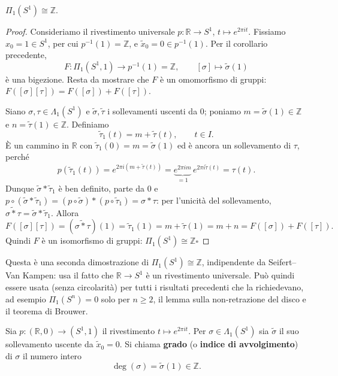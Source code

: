 \begin{teo}
$\Pi_1(S^1) \cong \mathbb{Z}$.
\end{teo}
\begin{proof}
Consideriamo il rivestimento universale $p: \mathbb{R} \to S^1$, $t \mapsto e^{2\pi i t}$. Fissiamo $x_0 = 1 \in S^1$, per cui $p^{-1}(1) = \mathbb{Z}$, e $\widetilde{x}_0 = 0 \in p^{-1}(1)$. Per il corollario precedente,
\[
F: \Pi_1(S^1, 1) \to p^{-1}(1) = \mathbb{Z}, \qquad [\sigma] \mapsto \widetilde{\sigma}(1)
\]
\`e una bigezione. Resta da mostrare che $F$ \`e un omomorfismo di gruppi: $F([\sigma][\tau]) = F([\sigma]) + F([\tau])$.

Siano $\sigma, \tau \in \Lambda_1(S^1)$ e $\widetilde{\sigma}, \widetilde{\tau}$ i sollevamenti uscenti da $0$; poniamo $m = \widetilde{\sigma}(1) \in \mathbb{Z}$ e $n = \widetilde{\tau}(1) \in \mathbb{Z}$. Definiamo
\[
\widetilde{\tau}_1(t) = m + \widetilde{\tau}(t), \qquad t \in I .
\]
\`E un cammino in $\mathbb{R}$ con $\widetilde{\tau}_1(0) = m = \widetilde{\sigma}(1)$ ed \`e ancora un sollevamento di $\tau$, perch\'e
\[
p(\widetilde{\tau}_1(t)) = e^{2\pi i (m + \widetilde{\tau}(t))} = \underbrace{e^{2\pi i m}}_{=1}\, e^{2\pi i \widetilde{\tau}(t)} = \tau(t).
\]
Dunque $\widetilde{\sigma} * \widetilde{\tau}_1$ \`e ben definito, parte da $0$ e $p \circ (\widetilde{\sigma} * \widetilde{\tau}_1) = (p \circ \widetilde{\sigma}) * (p \circ \widetilde{\tau}_1) = \sigma * \tau$: per l'unicit\`a del sollevamento, $\widetilde{\sigma * \tau} = \widetilde{\sigma} * \widetilde{\tau}_1$. Allora
\[
F([\sigma][\tau]) = (\widetilde{\sigma * \tau})(1) = \widetilde{\tau}_1(1) = m + \widetilde{\tau}(1) = m + n = F([\sigma]) + F([\tau]).
\]
Quindi $F$ \`e un isomorfismo di gruppi: $\Pi_1(S^1) \cong \mathbb{Z}$\hfill$\square$
\end{proof}

\begin{observacion}
Questa \`e una seconda dimostrazione di $\Pi_1(S^1) \cong \mathbb{Z}$, indipendente da Seifert--Van Kampen: usa il fatto che $\mathbb{R} \to S^1$ \`e un rivestimento universale. Pu\`o quindi essere usata (senza circolarit\`a) per tutti i risultati precedenti che la richiedevano, ad esempio $\Pi_1(S^n)=0$ solo per $n \geqslant 2$, il lemma sulla non-retrazione del disco e il teorema di Brouwer.
\end{observacion}

\begin{definicion}
Sia $p: (\mathbb{R}, 0) \to (S^1, 1)$ il rivestimento $t \mapsto e^{2\pi i t}$. Per $\sigma \in \Lambda_1(S^1)$ sia $\widetilde{\sigma}$ il suo sollevamento uscente da $\widetilde{x}_0 = 0$. Si chiama \textbf{grado} (o \textbf{indice di avvolgimento}) di $\sigma$ il numero intero
\[
\deg(\sigma) = \widetilde{\sigma}(1) \in \mathbb{Z}.
\]
\end{definicion}

